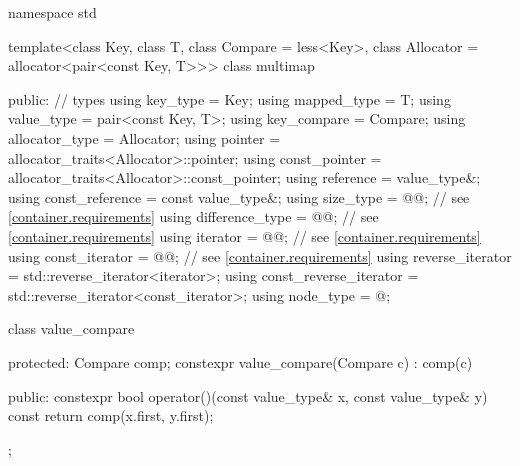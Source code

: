 %
%
\begin{codeblock}
namespace std {
  template<class Key, class T, class Compare = less<Key>,
           class Allocator = allocator<pair<const Key, T>>>
  class multimap {
  public:
    // types
    using key_type               = Key;
    using mapped_type            = T;
    using value_type             = pair<const Key, T>;
    using key_compare            = Compare;
    using allocator_type         = Allocator;
    using pointer                = allocator_traits<Allocator>::pointer;
    using const_pointer          = allocator_traits<Allocator>::const_pointer;
    using reference              = value_type&;
    using const_reference        = const value_type&;
    using size_type              = @@; // see \ref{container.requirements}
    using difference_type        = @@; // see \ref{container.requirements}
    using iterator               = @@; // see \ref{container.requirements}
    using const_iterator         = @@; // see \ref{container.requirements}
    using reverse_iterator       = std::reverse_iterator<iterator>;
    using const_reverse_iterator = std::reverse_iterator<const_iterator>;
    using node_type              = @\unspec@;

    class value_compare {
    protected:
      Compare comp;
      constexpr value_compare(Compare c) : comp(c) { }

    public:
      constexpr bool operator()(const value_type& x, const value_type& y) const {
        return comp(x.first, y.first);
      }
    };

}}
\end{codeblock}

